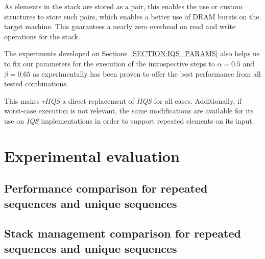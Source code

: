 As elements in the stack are stored as a pair, this enables the use or custom structures to store such pairs, which enables a better use of DRAM bursts on the target machine. This guarantees a nearly zero overhead on read and write operations for the stack.

The experiments developed on Sections~\ref{SECTION:IQS_PARAMS} also helps us to fix our parameters for the execution of the introspective steps to $\alpha=0.5$ and $\beta=0.65$ as experimentally has been proven to offer the best performance from all tested combinations.

This makes \emph{rIIQS} a direct replacement of \emph{IIQS} for all cases. Additionally, if worst-case execution is not relevant, the same modifications are available for its use on \emph{IQS} implementations in order to support repeated elements on its input.

\section{Experimental evaluation}


\subsection{Performance comparison for repeated sequences and unique sequences}

\subsection{Stack management comparison for repeated sequences and unique sequences}

